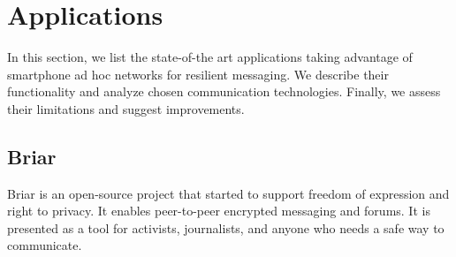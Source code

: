 \documentclass[conference,compsoc]{IEEEtran}
\begin{document}





\section{Applications} \label{applications}

In this section, we list the state-of-the art applications taking advantage of smartphone ad hoc networks for resilient messaging. We describe their functionality and analyze chosen communication technologies. Finally, we assess their limitations and suggest improvements.

\subsection{Briar}

Briar \cite{briar_gplay} is an open-source project that started to support freedom of expression and right to privacy. It enables peer-to-peer encrypted messaging and forums. It is presented as a tool for activists, journalists, and anyone who needs a safe way to communicate.
\end{document}

